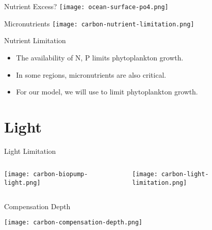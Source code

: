 \begin{frame}{Nutrient Excess?}
    \centering
    \texttt{[image: ocean-surface-po4.png]}
\end{frame}

\begin{frame}{Micronutrients}
    \centering
    \texttt{[image: carbon-nutrient-limitation.png]}
\end{frame}

\begin{frame}{Nutrient Limitation}

    \begin{itemize}
        \item The availability of N, P limits phytoplankton growth.
        \item In some regions, micronutrients are also critical.
        \item For our model, we will use  to limit phytoplankton growth.
    \end{itemize}

\end{frame}

\section{Light}

\begin{frame}{Light Limitation}
    \begin{columns}
        \begin{column}{0.7\linewidth}
            \texttt{[image: carbon-biopump-light.png]}
        \end{column}
        \begin{column}{0.3\linewidth}
            \texttt{[image: carbon-light-limitation.png]}
        \end{column}
    \end{columns}
\end{frame}

\begin{frame}{Compensation Depth}
    \centering

    \texttt{[image: carbon-compensation-depth.png]}
\end{frame}

